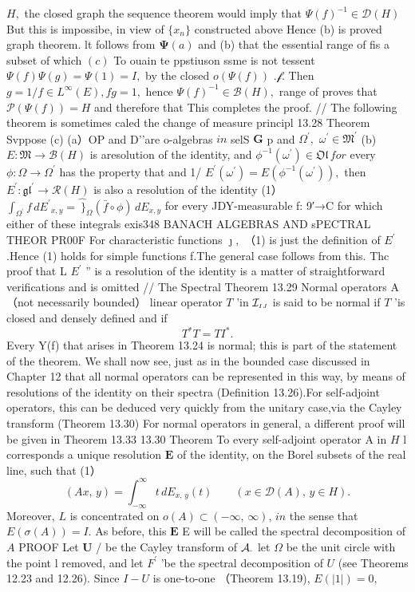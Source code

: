 $\textstyle H,$ the closed graph the sequence theorem would imply that $\Psi(f)^{-1}\in{\mathcal{D}}(H)$ But this is impossibe, in view of $\scriptstyle\{x_{n}\}$ constructed above Hence (b) is proved graph theorem. lt follows from $\mathbf{\Psi}(a)$ and (b) that the essential range of fis a subset of which $(c)$ To ouain te ppstiuson ssme is not tessent $\Psi(f)\Psi(g)=\Psi(1)=I,$ by the closed $o(\Psi(f))$ ${\big.}{\mathcal{f}}.$ Then $g=1/f\in L^{\infty}(E),f g=1,$ hence $\Psi(f)^{-1}\in{\mathcal{B}}(H),$ range of proves that ${\mathcal{P}}(\Psi(f))=H$ and therefore that This completes the proof. // The following theorem is sometimes caled the change of measure principl 13.28 Theorem Svppose (c) (a）OP and D'’are o-algebras $i n$ selS $\mathbf{G}$ p and $\Omega^{\prime},$ $\omega^{\prime}\in{\mathfrak{M}}^{\prime}$ (b) $E\colon{\mathfrak{M}}\to{\mathcal{B}}(H)$ is aresolution of the identity, and $\phi^{-1}(\omega^{\prime})\in\mathfrak{O l}\,f o r$ every $\phi\colon\Omega\to\Omega^{\prime}$ has the property that and 1/ $E^{\prime}(\omega^{\prime})=E(\phi^{-1}(\omega^{\prime})),$ then $E^{\prime}:{\mathfrak{g l}}^{\prime}\to{\mathcal{R}}(H)$ is also a resolution of the identity (1） $\int_{\Omega^{\prime}}\!f\,d E^{\prime}{}_{x,y}=\hat{\ \}}_{\Omega}(\bar{f}\circ\phi)\,d E_{x,y}$ for every JDY-measurable f: 9′→C for which either of these integrals exis348 BANACH ALGEBRAS AND sPECTRAL THEOR PR00F For characteristic functions ${\boldsymbol{\jmath}},$ （1) is just the definition of $E^{\prime}$ .Hence (1) holds for simple functions f.The general case follows from this. Thc proof that L $E^{\prime}$ ” is a resolution of the identity is a matter of straightforward verifications and is omitted // The Spectral Theorem 13.29 Normal operators A（not necessarily bounded） linear operator ${\mathbf{}}T$ 'in ${\cal I}_{\scriptscriptstyle I J}$ is said to be normal if ${\mathbf{}}T$ 'is closed and densely defined and if $$ T^{*}T=T I^{*}. $$ Every Y(f) that arises in Theorem 13.24 is normal; this is part of the statement of the theorem. We shall now see, just as in the bounded case discussed in Chapter 12 that all normal operators can be represented in this way, by means of resolutions of the identity on their spectra (Definition 13.26).For self-adjoint operators, this can be deduced very quickly from the unitary case,via the Cayley transform (Theorem 13.30) For normal operators in general, a different proof will be given in Theorem 13.33 13.30 Theorem To every self-adjoint operator A in $\textstyle H$ l corresponds a unique resolution ${\boldsymbol{E}}$ of the identity, on the Borel subsets of the real line, such that (1） $$ (A x,\,y)=\int_{-\infty}^{\infty}t\,d E_{x,\,y}(t)\qquad(x\in\mathcal{D}(A),\,y\in H). $$ Moreover, $\boldsymbol{\mathit{L}}$ is concentrated on $o(A)\subset(-\infty,\,\infty),\,i n$ the sense that $E(\sigma(A))=I.$ As before, this $\boldsymbol{E}$ E will be called the spectral decomposition of $\textstyle A$ PROOF Let ${\boldsymbol{U}}$ / be the Cayley transform of ${\cal A}_{\cdot}$ let $\Omega$ be the unit circle with the point l removed, and let $F^{\prime}$ ’be the spectral decomposition of $U$ (see Theorems 12.23 and 12.26). Since $I-U$ is one-to-one （Theorem 13.19), $E\left(\left|1\right|\right)=0,$ 